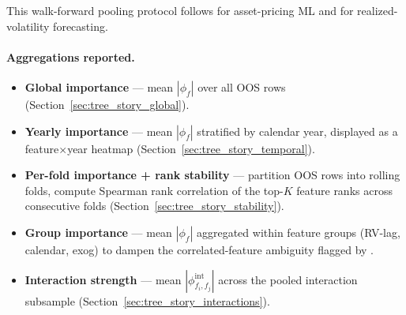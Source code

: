 This walk-forward pooling protocol follows
\citet{gu2020empirical} for asset-pricing ML and
\citet{christensen2023machine} for realized-volatility forecasting.

\paragraph{Aggregations reported.}
\begin{itemize}
    \item \textbf{Global importance} --- mean $|\phi_f|$ over all OOS
        rows (Section~\ref{sec:tree_story_global}).
    \item \textbf{Yearly importance} --- mean $|\phi_f|$ stratified
        by calendar year, displayed as a feature$\times$year
        heatmap (Section~\ref{sec:tree_story_temporal}).
    \item \textbf{Per-fold importance + rank stability} --- partition
        OOS rows into rolling folds, compute Spearman rank
        correlation of the top-$K$ feature ranks across consecutive
        folds (Section~\ref{sec:tree_story_stability}).
    \item \textbf{Group importance} --- mean $|\phi_f|$ aggregated
        within feature groups (RV-lag, calendar, exog) to dampen
        the correlated-feature ambiguity flagged by
        \citet{aas2021explaining}.
    \item \textbf{Interaction strength} --- mean
        $|\phi^{\text{int}}_{f_i, f_j}|$ across the pooled
        interaction subsample
        (Section~\ref{sec:tree_story_interactions}).
\end{itemize}

